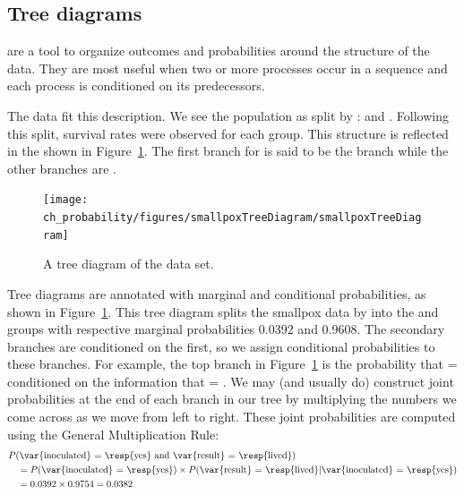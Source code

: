\subsection{Tree diagrams}


 are a tool to organize outcomes and probabilities around the structure of the data. They are most useful when two or more processes occur in a sequence and each process is conditioned on its predecessors.

The  data fit this description. We see the population as split by :  and . Following this split, survival rates were observed for each group. This structure is reflected in the  shown in Figure~\ref{smallpoxTreeDiagram}. The first branch for  is said to be the  branch while the other branches are .

\begin{figure}[ht]
\centering
\texttt{[image: ch\_probability/figures/smallpoxTreeDiagram/smallpoxTreeDiagram]}
\caption{A tree diagram of the  data set.}
\label{smallpoxTreeDiagram}
\end{figure}

Tree diagrams are annotated with marginal and conditional probabilities, as shown in Figure~\ref{smallpoxTreeDiagram}. This tree diagram splits the smallpox data by  into the  and  groups with respective marginal probabilities 0.0392 and 0.9608. The secondary branches are conditioned on the first, so we assign conditional probabilities to these branches. For example, the top branch in Figure~\ref{smallpoxTreeDiagram} is the probability that  =  conditioned on the information that  = . We may (and usually do) construct joint probabilities at the end of each branch in our tree by multiplying the numbers we come across as we move from left to right. These joint probabilities are computed using the General Multiplication Rule:
\begin{align*}
& P(\text{\var{inoculated} = \resp{yes}
    and \var{result} = \resp{lived}}) \\
  &\quad = P(\text{\var{inoculated} = \resp{yes}})\times
      P(\text{\var{result} = \resp{lived}}|
          \text{\var{inoculated} = \resp{yes}}) \\
  &\quad = 0.0392\times 0.9754=0.0382
\end{align*}


